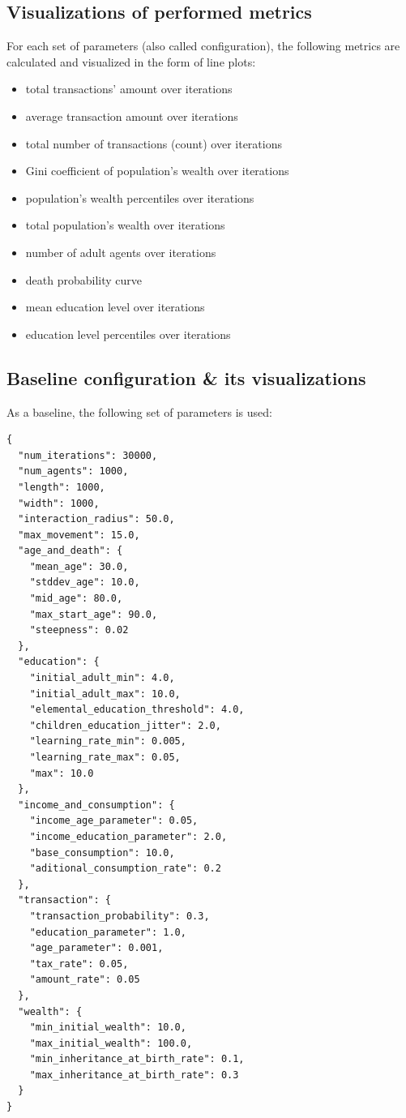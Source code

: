\documentclass[english]{projectreport}
\begin{document}
\subsection{Visualizations of performed metrics}

    For each set of parameters (also called configuration), the following metrics are calculated and visualized in the form of line plots:

    \begin{itemize}
        \item total transactions' amount over iterations
        \item average transaction amount over iterations
        \item total number of transactions (count) over iterations
        \item Gini coefficient of population's wealth over iterations
        \item population's wealth percentiles over iterations
        \item total population's wealth over iterations
        \item number of adult agents over iterations
        \item death probability curve
        \item mean education level over iterations
        \item education level percentiles over iterations
    \end{itemize}

\subsection{Baseline configuration \& its visualizations}

    As a baseline, the following set of parameters is used:

    \begin{verbatim}
{
  "num_iterations": 30000,
  "num_agents": 1000,
  "length": 1000,
  "width": 1000,
  "interaction_radius": 50.0,
  "max_movement": 15.0,
  "age_and_death": {
    "mean_age": 30.0,
    "stddev_age": 10.0,
    "mid_age": 80.0,
    "max_start_age": 90.0,
    "steepness": 0.02
  },
  "education": {
    "initial_adult_min": 4.0,
    "initial_adult_max": 10.0,
    "elemental_education_threshold": 4.0,
    "children_education_jitter": 2.0,
    "learning_rate_min": 0.005,
    "learning_rate_max": 0.05,
    "max": 10.0
  },
  "income_and_consumption": {
    "income_age_parameter": 0.05,
    "income_education_parameter": 2.0,
    "base_consumption": 10.0,
    "aditional_consumption_rate": 0.2
  },
  "transaction": {
    "transaction_probability": 0.3,
    "education_parameter": 1.0,
    "age_parameter": 0.001,
    "tax_rate": 0.05,
    "amount_rate": 0.05
  },
  "wealth": {
    "min_initial_wealth": 10.0,
    "max_initial_wealth": 100.0,
    "min_inheritance_at_birth_rate": 0.1,
    "max_inheritance_at_birth_rate": 0.3
  }
}
    \end{verbatim}
\end{document}
